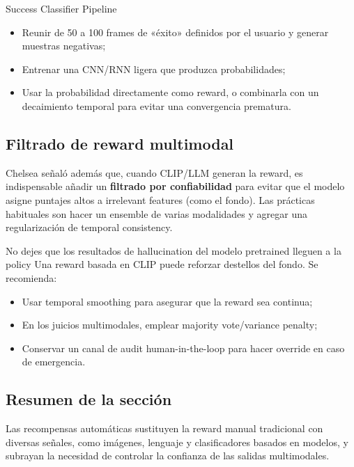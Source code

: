 \documentclass[a4paper]{article}
\begin{document}
\begin{knowledgebox}{Success Classifier Pipeline}
\begin{itemize}
\item Reunir de 50 a 100 frames de «éxito» definidos por el usuario y generar muestras negativas;\\
\item Entrenar una CNN/RNN ligera que produzca probabilidades;\\
\item Usar la probabilidad directamente como reward, o combinarla con un decaimiento temporal para evitar una convergencia prematura.
\end{itemize}
\end{knowledgebox}

\subsection{Filtrado de reward multimodal}
Chelsea señaló además que, cuando CLIP/LLM generan la reward, es indispensable añadir un \textbf{filtrado por confiabilidad} para evitar que el modelo asigne puntajes altos a irrelevant features (como el fondo). Las prácticas habituales son hacer un ensemble de varias modalidades y agregar una regularización de temporal consistency.

\begin{warningbox}{No dejes que los resultados de hallucination del modelo pretrained lleguen a la policy}
Una reward basada en CLIP puede reforzar destellos del fondo. Se recomienda:
\begin{itemize}
\item Usar temporal smoothing para asegurar que la reward sea continua;\\
\item En los juicios multimodales, emplear majority vote/variance penalty;\\
\item Conservar un canal de audit human-in-the-loop para hacer override en caso de emergencia.
\end{itemize}
\end{warningbox}

\subsection{Resumen de la sección}
Las recompensas automáticas sustituyen la reward manual tradicional con diversas señales, como imágenes, lenguaje y clasificadores basados en modelos, y subrayan la necesidad de controlar la confianza de las salidas multimodales.
\newpage
\end{document}
